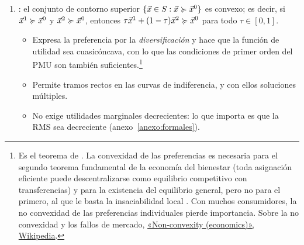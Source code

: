 \documentclass[11pt]{article}
\begin{document}
\begin{enumerate}
\begin{itemize}
  \item \emph{Monotonía}: si una cesta tiene más de \emph{todos} los bienes que otra, es estrictamente preferida: $\vect{x}\gg \vect{y}\Rightarrow \vect{x}\succ \vect{y}$. Implica la insaciabilidad local; las curvas de indiferencia son no crecientes (pueden tener tramos horizontales o verticales) y las mejores están al nordeste.
  \item \emph{Monotonía estricta}: basta tener más de \emph{algún} bien y no menos de ninguno: $\vect{x}\geq \vect{y}$, $\vect{x}\neq \vect{y}\Rightarrow \vect{x}\succ \vect{y}$. Las curvas de indiferencia son \emph{estrictamente decrecientes}\nocite{MasColellWhinstonGreen1995}.
  \end{itemize}
  Cada grado implica los anteriores: monotonía estricta $\Rightarrow$ monotonía $\Rightarrow$ insaciabilidad local $\Rightarrow$ no saturación global.
\item {}: el conjunto de contorno superior $\{\vec{x}\in S: \vec{x}\succcurlyeq \vec{x}^0\}$ es convexo; es decir, si $\vec{x}^1\succcurlyeq \vec{x}^0$ y $\vec{x}^2\succcurlyeq \vec{x}^0$, entonces $\tau \vec{x}^1+(1-\tau)\vec{x}^2\succcurlyeq \vec{x}^0$ para todo $\tau\in[0,1]$.
  \begin{itemize}
  \item Expresa la preferencia por la \emph{diversificación} y hace que la función de utilidad sea cuasicóncava, con lo que las condiciones de primer orden del PMU son también suficientes.\footnote{Es el teorema de \textcite{ArrowEnthoven1961Quasi}. La convexidad de las preferencias es necesaria para el segundo teorema fundamental de la economía del bienestar (toda asignación eficiente puede descentralizarse como equilibrio competitivo con transferencias) y para la existencia del equilibrio general, pero no para el primero, al que le basta la insaciabilidad local \nocite{MasColellWhinstonGreen1995}. Con muchos consumidores, la no convexidad de las preferencias individuales pierde importancia\nocite{Starr1969Quasi}. Sobre la no convexidad y los fallos de mercado, \href{https://en.wikipedia.org/wiki/Non-convexity_(economics)}{«Non-convexity (economics)», Wikipedia}.}
  \item Permite tramos rectos en las curvas de indiferencia, y con ellos soluciones múltiples.
  \item No exige utilidades marginales decrecientes: lo que importa es que la RMS sea decreciente (anexo~\ref{anexo:formales}).
  \end{itemize}


\end{enumerate}
\end{document}
